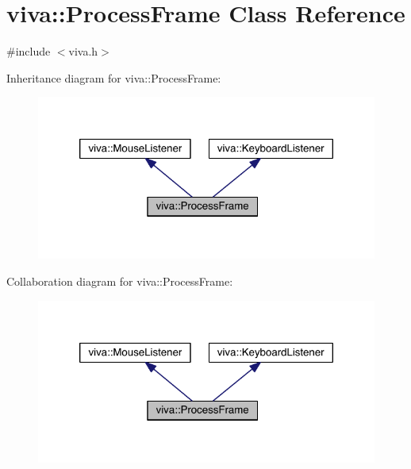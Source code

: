 \hypertarget{classviva_1_1_process_frame}{}\section{viva\+:\+:Process\+Frame Class Reference}
\label{classviva_1_1_process_frame}


{\ttfamily \#include $<$viva.\+h$>$}



Inheritance diagram for viva\+:\+:Process\+Frame\+:
\nopagebreak
\begin{figure}[H]
\begin{center}
\leavevmode
\includegraphics[width=320pt]{classviva_1_1_process_frame__inherit__graph}
\end{center}
\end{figure}


Collaboration diagram for viva\+:\+:Process\+Frame\+:
\nopagebreak
\begin{figure}[H]
\begin{center}
\leavevmode
\includegraphics[width=320pt]{classviva_1_1_process_frame__coll__graph}
\end{center}
\end{figure}
